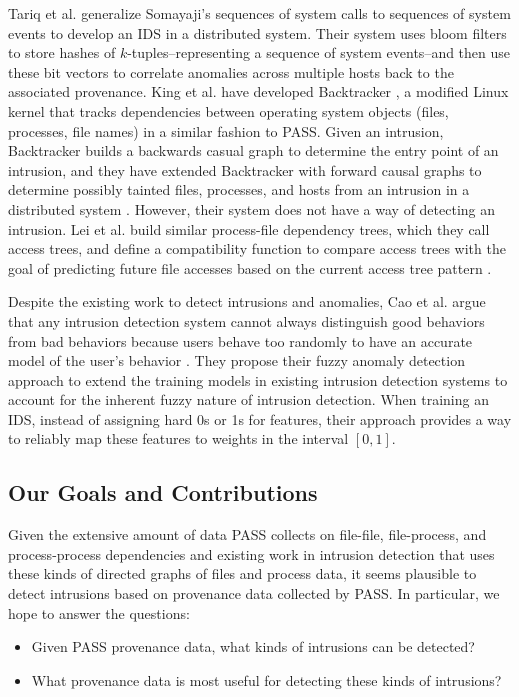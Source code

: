 \documentclass[10pt,twocolumn]{article}
\begin{document}
Tariq et al. generalize Somayaji's sequences of system calls to sequences of system events \cite{correlated-anomalies} to develop an IDS in a distributed system. Their system uses bloom filters to store hashes of $k$-tuples--representing a sequence of system events--and then use these bit vectors to correlate anomalies across multiple hosts back to the associated provenance. King et al. have developed Backtracker \cite{backtracker}, a modified Linux kernel that tracks dependencies between operating system objects (files, processes, file names) in a similar fashion to PASS. Given an intrusion, Backtracker builds a backwards casual graph to determine the entry point of an intrusion, and they have extended Backtracker with forward causal graphs to determine possibly tainted files, processes, and hosts from an intrusion in a distributed system \cite{multihost}. However, their system does not have a way of detecting an intrusion. Lei et al. build similar process-file dependency trees, which they call access trees, and define a compatibility function to compare access trees with the goal of predicting future file accesses based on the current access tree pattern \cite{fileprefetch}.

Despite the existing work to detect intrusions and anomalies, Cao et al. argue that any intrusion detection system cannot always distinguish good behaviors from bad behaviors because users behave too randomly to have an accurate model of the user's behavior \cite{fuzzy}. They propose their fuzzy anomaly detection approach to extend the training models in existing intrusion detection systems to account for the inherent fuzzy nature of intrusion detection. When training an IDS, instead of assigning hard 0s or 1s for features, their approach provides a way to reliably map these features to weights in the interval $[0,1]$. 

\subsection{Our Goals and Contributions}

Given the extensive amount of data PASS collects on file-file, file-process, and process-process dependencies and existing work in intrusion detection that uses these kinds of directed graphs of files and process data, it seems plausible to detect intrusions based on provenance data collected by PASS. In particular, we hope to answer the questions:
\begin{itemize}
\item Given PASS provenance data, what kinds of intrusions can be detected?
\item What provenance data is most useful for detecting these kinds of intrusions?
\end{itemize}
\end{document}
